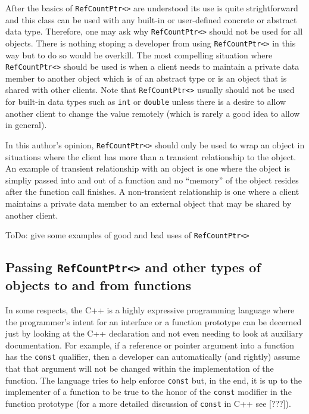 After the basics of \texttt{RefCountPtr<>} are understood its use is
quite strightforward and this class can be used with any built-in or
user-defined concrete or abstract data type.  Therefore, one may ask
why \texttt{RefCountPtr<>} should not be used for all objects.  There
is nothing stoping a developer from using \texttt{RefCountPtr<>} in
this way but to do so would be overkill.  The most compelling
situation where \texttt{RefCountPtr<>} should be used is when a client
needs to maintain a private data member to another object which is of
an abstract type or is an object that is shared with other clients.
Note that \texttt{RefCountPtr<>} usually should not be used for
built-in data types such as \texttt{int} or \texttt{double} unless
there is a desire to allow another client to change the value remotely
(which is rarely a good idea to allow in general).

In this author's opinion, \texttt{RefCountPtr<>} should only be used
to wrap an object in situations where the client has more than a
transient relationship to the object.  An example of transient
relationship with an object is one where the object is simpliy passed
into and out of a function and no ``memory'' of the object resides
after the function call finishes.  A non-transient relationship is one
where a client maintains a private data member to an external object
that may be shared by another client.

ToDo: give some examples of good and bad uses of \texttt{RefCountPtr<>}

%
\subsection{Passing \texttt{RefCountPtr<>} and other types of objects to and from functions}
%

In some respects, the C++ is a highly expressive programming language
where the programmer's intent for an interface or a function prototype
can be decerned just by looking at the C++ declaration and not even
needing to look at auxiliary documentation.  For example, if a
reference or pointer argument into a function has the \texttt{const}
qualifier, then a developer can automatically (and rightly) assume
that that argument will not be changed within the implementation of
the function.  The language tries to help enforce \texttt{const} but,
in the end, it is up to the implementer of a function to be true to
the honor of the \texttt{const} modifier in the function prototype
(for a more detailed discussion of \texttt{const} in C++ see [???]).

